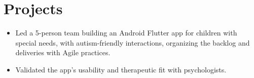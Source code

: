 \section{Projects}

\begin{itemize}
	\item Led a 5-person team building an Android Flutter app for children with special needs, with autism-friendly interactions, organizing the backlog and deliveries with Agile practices.
	\item Validated the app's usability and therapeutic fit with psychologists.
\end{itemize}
